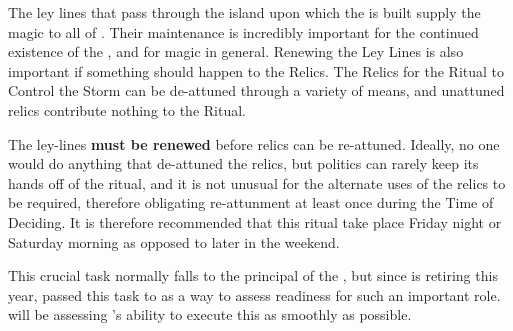 \documentclass[green]{GL2020}
\begin{document}
\name{\gLeyLines{}}

The ley lines that pass through the island upon which the \pSchool{} is built supply the magic to all of \pEarth{}. Their maintenance is incredibly important for the continued existence of the \pSc{}, and for magic in general. Renewing the Ley Lines is also important if something should happen to the Relics. The Relics for the Ritual to Control the Storm can be de-attuned through a variety of means, and unattuned relics contribute nothing to the Ritual. 

The ley-lines \textbf{must be renewed} before relics can be re-attuned. Ideally, no one would do anything that de-attuned the relics, but politics can rarely keep its hands off of the ritual, and it is not unusual for the alternate uses of the relics to be required, therefore obligating re-attunment at least once during the Time of Deciding. It is therefore recommended that this ritual take place Friday night or Saturday morning as opposed to later in the weekend.

This crucial task normally falls to the principal of the \pSc{}, but since \cPrincipal{\full} is retiring this year, \cPrincipal{\they} \cPrincipal{\have} passed this task to \cBeetle{} as a way to assess \cBeetle{\their} readiness for such an important role. \cPrincipal{} will be assessing \cBeetle{}’s ability to execute this as smoothly as possible.
\end{document}
